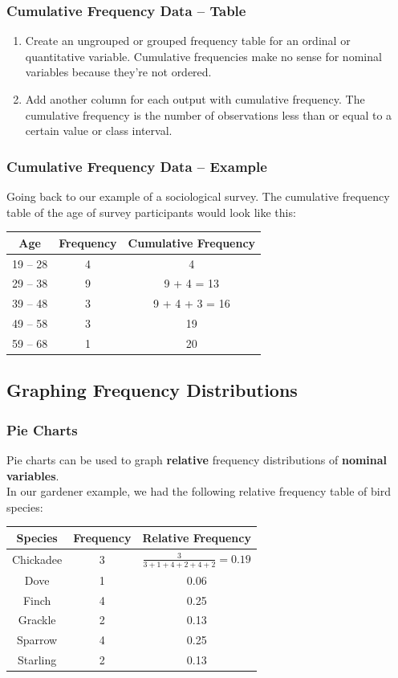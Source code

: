 \documentclass[aspectratio=169,11pt,svgnames,handout]{beamer}
\begin{document}
\begin{frame}
 \frametitle{Cumulative Frequency Data -- Table}
 \begin{enumerate}
  \item Create an ungrouped or grouped frequency table for \alert{an ordinal or
   quantitative variable}. Cumulative frequencies make no sense for nominal
   variables because they're not ordered.
  \pause
  \item Add another column for each output with \alert{cumulative frequency}.
   The cumulative frequency is the number of observations less than or equal to
   a certain value or class interval.
 \end{enumerate}
\end{frame}

\begin{frame}
 \frametitle{Cumulative Frequency Data -- Example}
 Going back to our example of a sociological survey. The cumulative frequency
 table of the age of survey participants would look like this:
 \begin{center}
  \begin{tabular}{c|c|c}
   \textbf{Age} & \textbf{Frequency} & \textbf{Cumulative Frequency}\\
   \toprule
   19 -- 28 & 4 & 4 \\
   29 -- 38 & 9 & 9 + 4 = 13 \\
   39 -- 48 & 3 & 9 + 4 + 3 = 16 \\
   49 -- 58 & 3 & 19 \\
   59 -- 68 & 1 & 20
  \end{tabular}
 \end{center}
\end{frame}

\subsection{Graphing Frequency Distributions}

\begin{frame}
 \subsectionpage
\end{frame}

\begin{frame}
 \frametitle{Pie Charts}
 Pie charts can be used to graph \textbf{relative} frequency distributions of
 \textbf{nominal variables}.\\
 \pause
 In our gardener example, we had the following relative frequency table of bird
 species:
 \begin{center}
  \begin{tabular}{c|c|c}
   \textbf{Species} & \textbf{Frequency} & \textbf{Relative Frequency}\\
   \toprule
   Chickadee & 3 & $\frac{3}{3 + 1 + 4 + 2 + 4 + 2} = 0.19$\\
   Dove & 1 & 0.06\\
   Finch & 4 & 0.25\\
   Grackle & 2 & 0.13\\
   Sparrow & 4 & 0.25\\
   Starling & 2 & 0.13
  \end{tabular}
 \end{center}
\end{frame}
\end{document}

